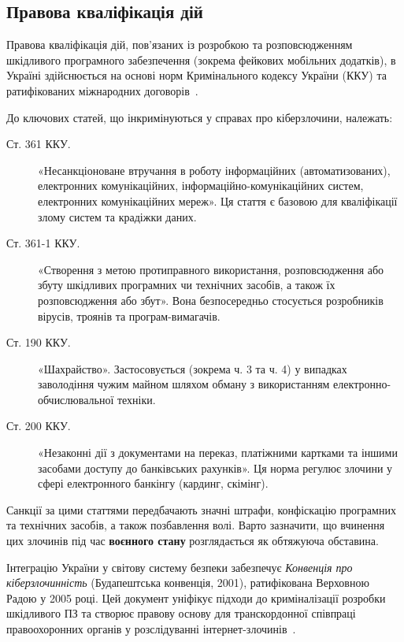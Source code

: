 \subsection*{Правова кваліфікація дій}

Правова кваліфікація дій, пов’язаних із розробкою та розповсюдженням шкідливого програмного забезпечення (зокрема фейкових мобільних додатків), в Україні здійснюється на основі норм Кримінального кодексу України (ККУ) та ратифікованих міжнародних договорів~\cite{KKU2001}.

До ключових статей, що інкримінуються у справах про кіберзлочини, належать:

\begin{description}
    \item[Ст. 361 ККУ.] «Несанкціоноване втручання в роботу інформаційних (автоматизованих), електронних комунікаційних, інформаційно-комунікаційних систем, електронних комунікаційних мереж». Ця стаття є базовою для кваліфікації злому систем та крадіжки даних.

    \newpage

    \item[Ст. 361-1 ККУ.] «Створення з метою протиправного використання, розповсюдження або збуту шкідливих програмних чи технічних засобів, а також їх розповсюдження або збут». Вона безпосередньо стосується розробників вірусів, троянів та програм-вимагачів.

    \item[Ст. 190 ККУ.] «Шахрайство». Застосовується (зокрема ч. 3 та ч. 4) у випадках заволодіння чужим майном шляхом обману з використанням електронно-обчислювальної техніки.

    \item[Ст. 200 ККУ.] «Незаконні дії з документами на переказ, платіжними картками та іншими засобами доступу до банківських рахунків». Ця норма регулює злочини у сфері електронного банкінгу (кардинг, скімінг).
\end{description}

Санкції за цими статтями передбачають значні штрафи, конфіскацію програмних та технічних засобів, а також позбавлення волі. Варто зазначити, що вчинення цих злочинів під час \textbf{воєнного стану} розглядається як обтяжуюча обставина.

Інтеграцію України у світову систему безпеки забезпечує \textit{Конвенція про кіберзлочинність} (Будапештська конвенція, 2001), ратифікована Верховною Радою у 2005 році. Цей документ уніфікує підходи до криміналізації розробки шкідливого ПЗ та створює правову основу для транскордонної співпраці правоохоронних органів у розслідуванні інтернет-злочинів~\cite{Budapest_Convention_2001}.



